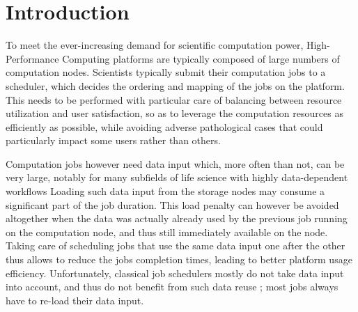 \documentclass[sigconf,review,anonymous]{acmart}
\newcommand{\rev}[1]{{\color{black}{#1}}}
\begin{document}
\begin{abstract}
  

\end{abstract}

\maketitle

\section{Introduction}\label{sec.introduction}

To meet the ever-increasing demand for scientific computation power,
High-Performance Computing platforms are typically composed of large
numbers of computation nodes. Scientists typically submit their
computation jobs to a scheduler, which decides the ordering and mapping
of the jobs on the platform. This needs to be performed with particular
care of balancing between resource utilization and user satisfaction, so
as to leverage the computation resources as efficiently as possible,
while avoiding adverse pathological cases that could particularly impact
some users rather than others.

Computation jobs however need data input which, more often than not, can
be very large, notably for many subfields of life science with highly
data-dependent workflows \rev{like taxonomic identification of DNA fragments, genome alignments or ancestral reconstructions. It is a frequent use pattern for users of such communities to submit
large batch of jobs using the same input files.}
Loading such data input from the storage
nodes may consume a significant part of the job duration. This load
penalty can however be avoided altogether when the data was actually
already used by the previous job running on the computation node, and
thus still immediately available on the node. Taking care of scheduling
jobs that use the same data input one after the other thus allows to
reduce the jobs completion times, leading to better platform usage
efficiency. Unfortunately, classical job schedulers mostly do not take
data input into account, and thus do not benefit from such data reuse ;
most jobs always have to re-load their data input.
\end{document}
